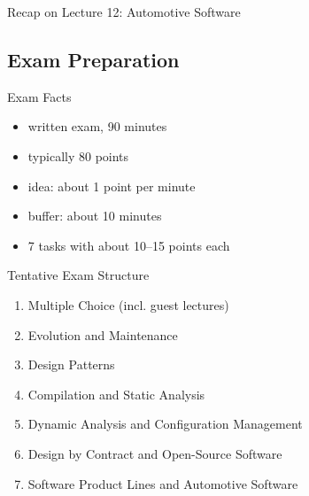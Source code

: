 \begin{frame}{Recap on Lecture 12: Automotive Software} %
	\begin{fancycolumns}[columns=3,widths={5,90,5},animation=none]
	\nextcolumn
	\nextcolumn
\end{fancycolumns}
\end{frame}

\subsection{Exam Preparation}
\begin{frame}{\insertsubsection}
	\begin{fancycolumns}[widths={45}]
		\begin{definition}{Exam Facts}
			\begin{itemize}
				\item written exam, 90 minutes
				\item typically 80 points
				\item idea: about 1 point per minute
				\item buffer: about 10 minutes
				\item 7 tasks with about 10--15 points each
			\end{itemize}
		\end{definition}
	\nextcolumn
		\begin{definition}{Tentative Exam Structure}
			\begin{enumerate}
				\item Multiple Choice (incl. guest lectures)
				\item Evolution and Maintenance
				\item Design Patterns
				\item Compilation and Static Analysis
				\item Dynamic Analysis and Configuration Management
				\item Design by Contract and Open-Source Software
				\item Software Product Lines and Automotive Software
			\end{enumerate}
		\end{definition}
	\end{fancycolumns}
\end{frame}

